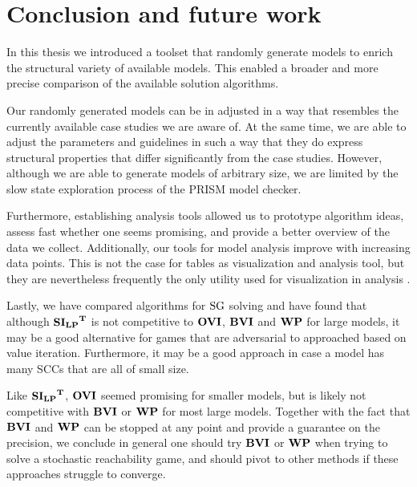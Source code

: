 \chapter{Conclusion and future work} \label{ch:conclusion}
In this thesis we introduced a toolset that randomly generate models to enrich the structural variety of available models.
This enabled a broader and more precise comparison of the available solution algorithms.

Our randomly generated models can be in adjusted in a way that resembles the currently available case studies we are aware of.
At the same time, we are able to adjust the parameters and guidelines in such a way that they do express structural properties that differ significantly from the case studies.
However, although we are able to generate models of arbitrary size, we are limited by the slow state exploration process of the PRISM model checker. 

Furthermore, establishing analysis tools allowed us to prototype algorithm ideas, assess fast whether one seems promising,
and provide a better overview of the data we collect. 
Additionally, our tools for model analysis improve with increasing data points.
This is not the case for tables as visualization and analysis tool, 
but they are nevertheless frequently the only utility used for visualization in analysis \cite{paperMaxi,widestPath,learningBased}.

Lastly, we have compared algorithms for $\textrm{SG}$ solving and have found that although $\mathbf{\mathbf{SI_{LP}}^T}$ is not competitive to $\mathbf{OVI}$, $\mathbf{BVI}$ and $\mathbf{WP}$ for large models,
it may be a good alternative for games that are adversarial to approached based on value iteration. 
Furthermore, it may be a good approach in case a model has many SCCs that are all of small size.

Like $\mathbf{\mathbf{SI_{LP}}^T}$, $\mathbf{OVI}$ seemed promising for smaller models, but is likely not competitive with $\mathbf{BVI}$ or $\mathbf{WP}$ for most large models.
Together with the fact that $\mathbf{BVI}$ and $\mathbf{WP}$ can be stopped at any point and provide a guarantee on the precision, 
we conclude in general one should try $\mathbf{BVI}$ or $\mathbf{WP}$ when trying to solve a stochastic reachability game, 
and should pivot to other methods if these approaches struggle to converge.

